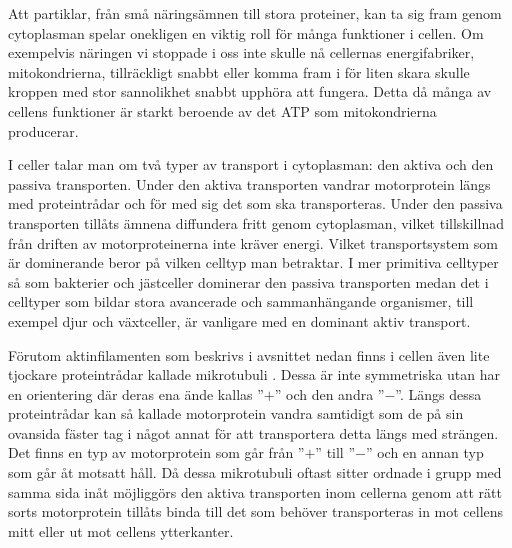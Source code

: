 Att partiklar, från små näringsämnen till stora proteiner, kan ta sig fram genom cytoplasman spelar onekligen en viktig roll för många funktioner i cellen. Om exempelvis näringen vi stoppade i oss inte skulle nå cellernas energifabriker, mitokondrierna, tillräckligt snabbt eller komma fram i för liten skara skulle kroppen med stor sannolikhet snabbt upphöra att fungera. Detta då många av cellens funktioner är starkt beroende av det ATP som mitokondrierna\footnotemark{} producerar.

I celler talar man om två typer av transport i cytoplasman: den aktiva och den passiva transporten. Under den aktiva transporten vandrar motorprotein längs med proteintrådar och för med sig det som ska transporteras. Under den passiva transporten tillåts ämnena diffundera fritt genom cytoplasman, vilket tillskillnad från driften av motorproteinerna inte kräver energi.%
Vilket transportsystem som är dominerande beror på vilken celltyp man betraktar. I mer primitiva celltyper så som bakterier och jästceller dominerar den passiva transporten medan det i celltyper som bildar stora avancerade och sammanhängande organismer, till exempel djur och växtceller, är vanligare med en dominant aktiv transport. 

Förutom aktinfilamenten som beskrivs i avsnittet nedan finns i cellen även lite tjockare proteintrådar kallade mikrotubuli \cite{Cooper_TheCell2000}. Dessa är inte symmetriska utan har en orientering där deras ena ände kallas ''$+$'' och den andra ''$-$''. Längs dessa proteintrådar kan så kallade motorprotein vandra samtidigt som de på sin ovansida fäster tag i något annat för att transportera detta längs med strängen. Det finns en typ av motorprotein som går från ''$+$'' till ''$-$'' och en annan typ som går åt motsatt håll. Då dessa mikrotubuli oftast sitter ordnade i grupp med samma sida inåt möjliggörs den aktiva transporten inom cellerna genom att rätt sorts motorprotein tillåts binda till det som behöver transporteras in mot cellens mitt eller ut mot cellens ytterkanter. 


